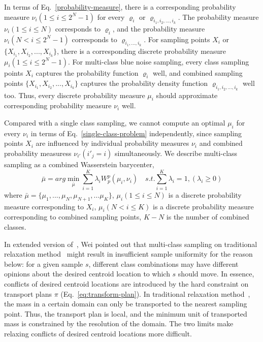 In terms of Eq.~\ref{probability-measure},
there is a corresponding probability measure $\nu_i(1\leq i\leq 2^N-1)$ for every $\varrho_i$ or  $\varrho_{{i_1,i_2,...,i_k}}$.
The probability measure $\nu_i(1\leq i\leq N)$ corresponds to $\varrho_i$,
and the probability measure $\nu_i(N<i\leq 2^N-1)$ corresponds to $\varrho_{i_1,...,i_k}$.
For sampling points $X_i$ or $\{X_{i_1}, X_{i_2},...,X_{i_k}\}$,
there is a corresponding discrete probability measure $\mu_i(1\leq i\leq 2^N-1)$.
For multi-class blue noise sampling,
every class sampling points $X_i$ captures the probability function $\varrho_i$ well,
and combined sampling points $\{X_{i_1}, X_{i_2},...,X_{i_k}\}$ captures the probability density function $\varrho_{i_1,i_2,...,i_k}$ well too.
Thus,
every discrete probability measure $\mu_i$ should approximate corresponding probability measure $\nu_i$ well.

Compared with a single class sampling,
we cannot compute an optimal $\mu_i$ for every $\nu_i$ in terms of Eq.~\ref{single-class-problem} independently,
since sampling points $X_i$ are influenced by individual probability measures $\nu_i$ and combined probability measuress $\nu_{i'}(i'_j=i)$ simultaneously.
We describe multi-class sampling as a combined Wasserstein barycenter,
\begin{equation}\label{eq:combined-wasserstein-barycenter}
 \bar\mu=arg\min\limits_{\bar\mu}\sum\limits_{i=1}^K\lambda_iW_p^p(\mu_i,\nu_i) \quad
  s.t.\sum\limits_{i=1}^K\lambda_i=1,(\lambda_i\geq0)
\end{equation}
where $\bar\mu=\{\mu_1,...,\mu_N,\mu_{N+1},...\mu_{K}\}$,
$\mu_i(1\leq i\leq N)$  is a discrete probability measure corresponding to $X_i$,
$\mu_i(N < i\leq K)$ is a discrete probability measure corresponding to combined sampling points,
$K-N$ is the number of combined classes.

In extended version of~\cite{wei:2010:multi},
Wei pointed out that multi-class sampling on traditional relaxation method~\cite{balzer:2009:capacity}
 might result in insufficient sample
uniformity for the reason below: for a given sample $s$,
different class combinations may have different opinions about the desired centroid
location to which $s$ should move.
In essence,
conflicts of desired centroid locations are introduced by the hard constraint on transport plans $\pi$ (Eq.~\ref{eq:transform-plan}).
In traditional relaxation method~\cite{balzer:2009:capacity},
the mass in a certain domain can only be transported to the nearest sampling point.
Thus, the transport plan is local,
and the minimum unit of transported mass is constrained by the resolution of the domain.
The two limits make relaxing conflicts of desired centroid locations more difficult.

